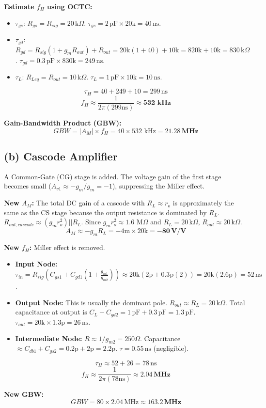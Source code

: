 \documentclass[11pt, a4paper]{article}
\newcommand{\kohm}{\,\text{k}\Omega}
\newcommand{\pF}{\,\text{pF}}
\newcommand{\ns}{\,\text{ns}}
\newcommand{\MHz}{\,\text{MHz}}
\begin{document}
\textbf{Estimate $f_H$ using OCTC:}
\begin{itemize}
    \item $\tau_{gs}$: $R_{gs} = R_{sig} = 20 \kohm$.
    $\tau_{gs} = 2 \pF \times 20 \text{k} = 40 \ns$.
    \item $\tau_{gd}$: $R_{gd} = R_{sig}(1 + g_m R_{out}) + R_{out} = 20\text{k}(1 + 40) + 10\text{k} = 820\text{k} + 10\text{k} = 830 \kohm$.
    $\tau_{gd} = 0.3 \pF \times 830 \text{k} = 249 \ns$.
    \item $\tau_{L}$: $R_{Leq} = R_{out} = 10 \kohm$.
    $\tau_{L} = 1 \pF \times 10 \text{k} = 10 \ns$.
\end{itemize}
\[ \tau_H = 40 + 249 + 10 = 299 \ns \]
\[ f_H \approx \frac{1}{2 \pi (299\text{ns})} \approx \mathbf{532 \text{ kHz}} \]

\textbf{Gain-Bandwidth Product (GBW):}
\[ GBW = |A_M| \times f_H = 40 \times 532 \text{ kHz} = \mathbf{21.28 \MHz} \]

\subsection*{(b) Cascode Amplifier}
A Common-Gate (CG) stage is added. The voltage gain of the first stage becomes small ($A_{v1} \approx -g_m / g_m = -1$), suppressing the Miller effect.

\textbf{New $A_M$:}
The total DC gain of a cascode with $R_L \approx r_o$ is approximately the same as the CS stage because the output resistance is dominated by $R_L$.
$R_{out,cascode} \approx (g_m r_o^2) || R_L$. Since $g_m r_o^2 \approx 1.6 \text{ M}\Omega$ and $R_L = 20 \kohm$, $R_{out} \approx 20 \kohm$.
\[ A_M \approx -g_m R_L = -4 \text{m} \times 20 \text{k} = \mathbf{-80\,\text{V/V}} \]

\textbf{New $f_H$:}
Miller effect is removed.
\begin{itemize}
    \item \textbf{Input Node:} $\tau_{in} = R_{sig} (C_{gs1} + C_{gd1}(1 + \frac{g_{m1}}{g_{m2}})) \approx 20\text{k} (2\text{p} + 0.3\text{p}(2)) = 20\text{k}(2.6\text{p}) = 52 \ns$.
    \item \textbf{Output Node:} This is usually the dominant pole. $R_{out} \approx R_L = 20 \kohm$. Total capacitance at output is $C_L + C_{gd2} = 1 \pF + 0.3 \pF = 1.3 \pF$.
    $\tau_{out} = 20\text{k} \times 1.3\text{p} = 26 \ns$.
    \item \textbf{Intermediate Node:} $R \approx 1/g_{m2} = 250 \Omega$. Capacitance $\approx C_{db1} + C_{gs2} = 0.2\text{p} + 2\text{p} = 2.2\text{p}$. $\tau = 0.55 \ns$ (negligible).
\end{itemize}
\[ \tau_H \approx 52 + 26 = 78 \ns \]
\[ f_H \approx \frac{1}{2 \pi (78\text{ns})} \approx \mathbf{2.04 \MHz} \]

\textbf{New GBW:}
\[ GBW = 80 \times 2.04 \MHz \approx \mathbf{163.2 \MHz} \]
\end{document}

